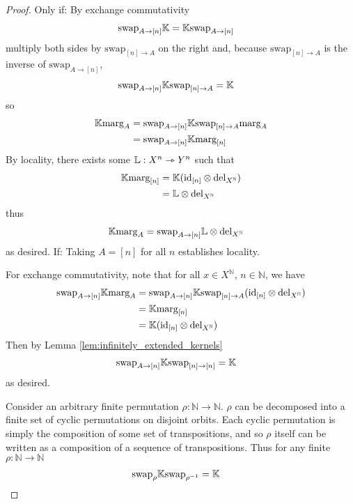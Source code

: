 \begin{proof}
Only if:
By exchange commutativity
\begin{align}
    \text{swap}_{A\rightarrow [n]} \mathbb{K} &= \mathbb{K} \text{swap}_{A\rightarrow [n]}
\end{align}
multiply both sides by $\text{swap}_{[n]\rightarrow A}$ on the right and, because $\text{swap}_{[n]\rightarrow A}$ is the inverse of $\text{swap}_{A\rightarrow [n]}$,
\begin{align}
        \text{swap}_{A\rightarrow [n]} \mathbb{K}\text{swap}_{[n] \rightarrow A} &= \mathbb{K}
\end{align}
so
\begin{align}
    \mathbb{K}\text{marg}_A &= \text{swap}_{A\rightarrow [n]} \mathbb{K}\text{swap}_{[n]\rightarrow A}\text{marg}_A\\
    &= \text{swap}_{A\rightarrow [n]} \mathbb{K}\text{marg}_{[n]}
\end{align}
By locality, there exists some $\mathbb{L}:X^n\rightarrowtriangle Y^n$ such that
\begin{align}
    \mathbb{K} \text{marg}_{[n]} &= \mathbb{K}(\text{id}_{[n]}\otimes \text{del}_{X^{\mathbb{N}}})\\
     &= \mathbb{L}\otimes \mathrm{del}_{X^{\mathbb{N}}}
\end{align}
thus
\begin{align}
    \mathbb{K} \text{marg}_A &= \text{swap}_{A\rightarrow [n]} \mathbb{L}\otimes \text{del}_{X^{\mathbb{N}}}
\end{align}
as desired.
If:
Taking $A=[n]$ for all $n$ establishes locality.

For exchange commutativity, note that for all $x\in X^{\mathbb{N}}$, $n\in\mathbb{N}$, we have
\begin{align}
    \text{swap}_{A\rightarrow [n]} \mathbb{K} \text{marg}_A &= \text{swap}_{A\rightarrow [n]} \mathbb{K} \text{swap}_{[n]\rightarrow A} (\text{id}_{[n]}\otimes \text{del}_{X^{\mathbb{N}}})\\
     &= \mathbb{K} \text{marg}_{[n]}\\
     &= \mathbb{K}(\text{id}_{[n]}\otimes \text{del}_{X^{\mathbb{N}}})
\end{align}
Then by Lemma \ref{lem:infinitely_extended_kernels}
\begin{align}
    \text{swap}_{A\rightarrow [n]} \mathbb{K} \text{swap}_{[n]\rightarrow [n]} &= \mathbb{K}
\end{align}
as desired.

Consider an arbitrary finite permutation $\rho:\mathbb{N}\to \mathbb{N}$. $\rho$ can be decomposed into a finite set of cyclic permutations on disjoint orbits. Each cyclic permutation is simply the composition of some set of transpositions, and so $\rho$ itself can be written as a composition of a sequence of transpositions. Thus for any finite $\rho:\mathbb{N}\to\mathbb{N}$
\begin{align}
    \text{swap}_{\rho} \mathbb{K} \text{swap}_{\rho^{-1}} &= \mathbb{K}
\end{align}
\end{proof}


